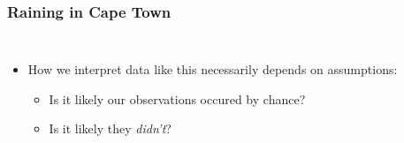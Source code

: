 \documentclass{beamer}
\begin{document}
\begin{frame}

\frametitle{Raining in Cape Town}

\begin{columns}[c]  \small

\begin{itemize}

	\item How we interpret data like this necessarily depends on assumptions:

	\begin{itemize}

		\item Is it likely our observations occured by chance?

		\item Is it likely they \emph{didn't}?

	\end{itemize}

\end{itemize}



\end{columns}
\end{frame}
\end{document}

